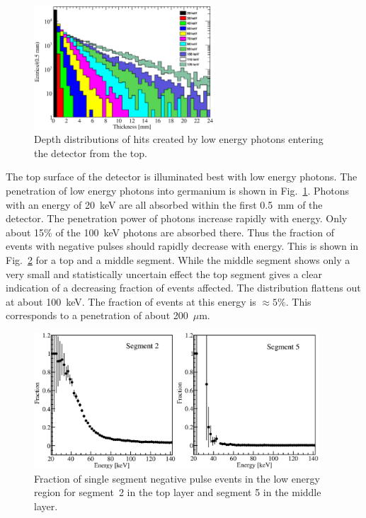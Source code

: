 \begin{figure}[tphb]
\centering
\includegraphics[width=0.6\textwidth]{gDepth}
\caption{Depth distributions of hits created by low energy photons
entering the detector from the top.}
\label{fig:np:gdep}
\end{figure}

The top surface of the detector is illuminated best with low energy
photons. The penetration of low energy photons into germanium is shown
in Fig.~\ref{fig:np:gdep}. Photons with an energy of 20~keV are all
absorbed within the first 0.5~mm of the detector. The penetration
power of photons increase rapidly with energy. Only about 15\% of the
100~keV photons are absorbed there. Thus the fraction of events with
negative pulses should rapidly decrease with energy. This is shown in
Fig.~\ref{fig:np:fraclow} for a top and a middle segment. While the
middle segment shows only a very small and statistically uncertain
effect the top segment gives a clear indication of a decreasing
fraction of events affected. The distribution flattens out at about
100~keV. The fraction of events at this energy is $\approx 5\%$. This
corresponds to a penetration of about 200~$\mu$m.

\begin{figure}[tphb]
\centering
\includegraphics[width=0.95\textwidth]{NegFraction20140}
\caption{Fraction of single segment negative pulse events in the low
energy region for segment~2 in the top layer and segment 5 in the
middle layer.}
\label{fig:np:fraclow}
\end{figure}

